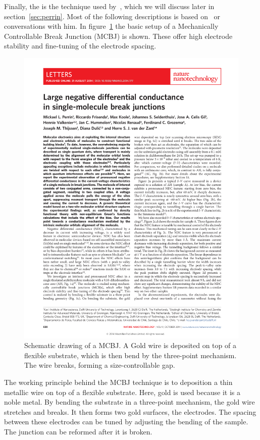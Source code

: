 Finally, the  is the technique used by~\citet{perrinnano}, which we will discuss later in section~\ref{sec:perrin}. Most of the following descriptions is based on~\citet{perrin} or conversations with him. In figure~\ref{fig:mcbj} the basic setup of a Mechanically Controllable Break Junction (MCBJ) is shown. These offer high electrode stability and fine-tuning of the electrode spacing. 
\begin{figure}[!bp]
    \centering
    \includegraphics[height=0.3\textheight,page=2, clip=true, trim=2.5cm 16.5cm 11cm 6cm]{pdf/perrinnnano.pdf}
    \caption{Schematic drawing of a MCBJ. A Gold wire is deposited on top of a flexible substrate, which is then bend by the three-point mechanism. The wire breaks, forming a size-controllable gap.}
    \label{fig:mcbj}
\end{figure}

The working principle behind the MCBJ technique is to deposition a thin metallic wire on top of a flexible substrate. Here, gold is used because it is a noble metal. By bending the substrate in a three-point mechanism, the gold wire stretches and breaks. It then forms two gold surfaces, the electrodes. The spacing between these electrodes can be tuned by adjusting the bending of the sample. The junction can be reformed after it is broken.

